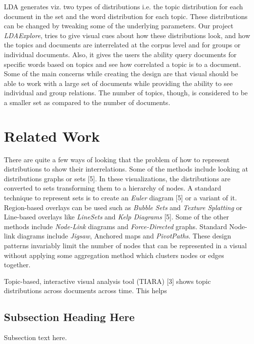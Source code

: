 \documentclass[10pt,journal,compsoc]{IEEEtran}
\begin{document}
LDA generates viz. two types of distributions i.e. the topic distribution for each document in the set and the word distribution for each topic. These distributions can be changed by tweaking some of the underlying parameters. Our project \textit{LDAExplore}, tries to give visual cues about how these distributions look, and how the topics and documents are interrelated at the corpus level and for groups or individual documents. Also, it gives the users the ability query documents for specific words based on topics and see how correlated a topic is to a document. Some of the main concerns while creating the design are that visual should be able to work with a large set of documents while providing the ability to see individual and group relations. The number of topics, though, is considered to be a smaller set as compared to the number of documents.

\section{Related Work}
\label{sec:RelatedWork}
There are quite a few ways of looking that the problem of how to represent distributions to show their interrelations. Some of the methods include looking at distributions graphs or sets [5]. In these visualizations, the distributions are converted to sets transforming them to a hierarchy of nodes. A standard technique to represent sets is to create an \textit{Euler} diagram [5] or a variant of it. Region-based overlays can be used such as \textit{Bubble Sets} and \textit{Texture Splatting} or Line-based overlays like \textit{LineSets} and \textit{Kelp Diagrams} [5]. Some of the other methods include \textit{Node-Link} diagrams and \textit{Force-Directed} graphs. Standard Node-link diagrams include \textit{Jigsaw}, Anchored maps and \textit{PivotPaths}. These design patterns invariably limit the number of nodes that can be represented in a visual without applying some aggregation method which clusters nodes or edges together.

Topic-based, interactive visual analysis tool (TIARA) [3] shows topic distributions across documents across time. This helps 

\subsection{Subsection Heading Here}
Subsection text here.

\end{document}
